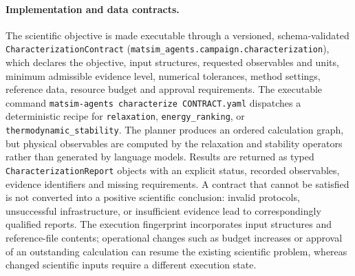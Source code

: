 \documentclass[11pt,a4paper]{article}
\begin{document}
\paragraph{Implementation and data contracts.}
The scientific objective is made executable through a versioned, schema-validated \texttt{CharacterizationContract} (\texttt{matsim\_agents.campaign.characterization}), which declares the objective, input structures, requested observables and units, minimum admissible evidence level, numerical tolerances, method settings, reference data, resource budget and approval requirements. The executable command \texttt{matsim-agents characterize CONTRACT.yaml} dispatches a deterministic recipe for \texttt{relaxation}, \texttt{energy\_ranking}, or \texttt{thermodynamic\_stability}. The planner produces an ordered calculation graph, but physical observables are computed by the relaxation and stability operators rather than generated by language models. Results are returned as typed \texttt{CharacterizationReport} objects with an explicit status, recorded observables, evidence identifiers and missing requirements. A contract that cannot be satisfied is not converted into a positive scientific conclusion: invalid protocols, unsuccessful infrastructure, or insufficient evidence lead to correspondingly qualified reports. The execution fingerprint incorporates input structures and reference-file contents; operational changes such as budget increases or approval of an outstanding calculation can resume the existing scientific problem, whereas changed scientific inputs require a different execution state.
\end{document}
